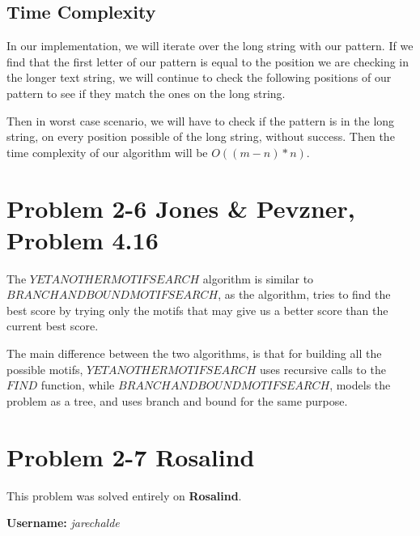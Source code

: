 \documentclass{article}
\begin{document}
\subsection*{Time Complexity}

In our implementation, we will iterate over the long string with our pattern. If we find that the first letter of our pattern is equal to the position we are checking in the longer text string, we will continue to check the following positions of our pattern to see if they match the ones on the long string. 

Then in worst case scenario, we will have to check if the pattern is in the long string, on every position possible of the long string, without success. Then the time complexity of our algorithm will be $O((m-n)*n)$.

\section*{Problem 2-6 Jones \& Pevzner, Problem 4.16}

The $YETANOTHERMOTIFSEARCH$ algorithm is similar to $BRANCHANDBOUNDMOTIFSEARCH$, as the algorithm, tries to find the best score by trying only the motifs that may give us a better score than the current best score.

The main difference between the two algorithms, is that for building all the possible motifs, $YETANOTHERMOTIFSEARCH$ uses recursive calls to the $FIND$ function, while $BRANCHANDBOUNDMOTIFSEARCH$, models the problem as a tree, and uses branch and bound for the same purpose.

\section*{Problem 2-7 Rosalind}

This problem was solved entirely on \textbf{Rosalind}.

\textbf{Username:} \textit{jarechalde}
\end{document}
